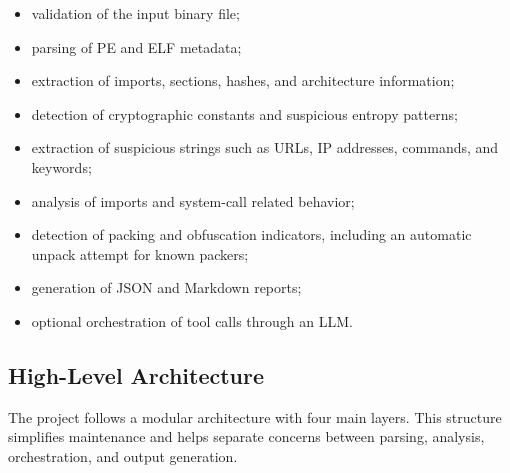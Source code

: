 \documentclass[11pt,a4paper]{article}
\begin{document}
\begin{itemize}
\item validation of the input binary file;
\item parsing of PE and ELF metadata;
\item extraction of imports, sections, hashes, and architecture information;
\item detection of cryptographic constants and suspicious entropy patterns;
\item extraction of suspicious strings such as URLs, IP addresses, commands, and keywords;
\item analysis of imports and system-call related behavior;
\item detection of packing and obfuscation indicators, including an automatic unpack attempt for known packers;
\item generation of JSON and Markdown reports;
\item optional orchestration of tool calls through an LLM.
\end{itemize}

\subsection{High-Level Architecture}
The project follows a modular architecture with four main layers. This structure simplifies maintenance and helps separate concerns between parsing, analysis, orchestration, and output generation.
\end{document}
